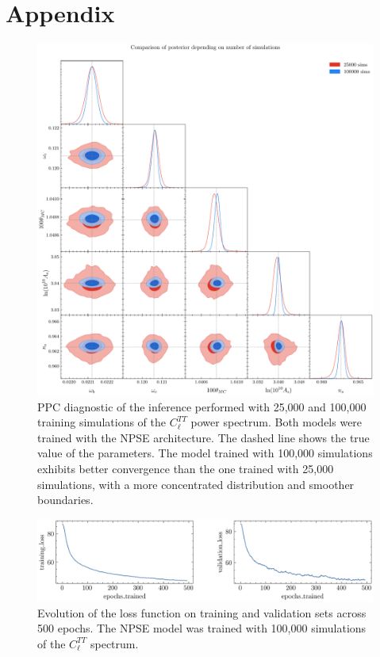 \section{Appendix}
\begin{figure}
    \centering
    \includegraphics[scale=0.35]{img/nsims_comparison.pdf}
    \caption{PPC diagnostic of the inference performed with 25,000 and 100,000 training simulations of the $C_{\ell}^{TT}$ power spectrum. Both models were trained with the NPSE architecture. The dashed line shows the true value of the parameters. The model trained with 100,000 simulations exhibits better convergence than the one trained with 25,000 simulations, with a more concentrated distribution and smoother boundaries.}
    \label{fig:nsims_comparison}
\end{figure}

\begin{figure}
    \centering
    \includegraphics[scale=0.45]{img/NPSE_TT_tau_100000}
    \caption{Evolution of the loss function on training and validation sets across 500 epochs. The NPSE model was trained with 100,000 simulations of the $C_{\ell}^{TT}$ spectrum.}
    \label{fig:nsims_comparison}
\end{figure}

